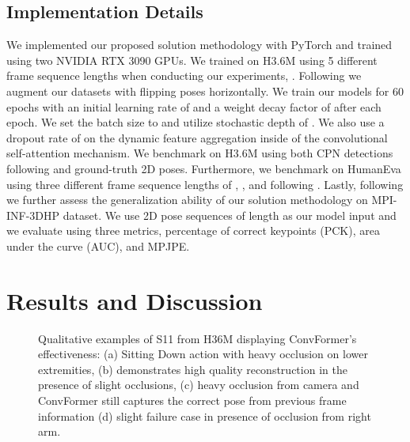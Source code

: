 \documentclass{article}
\begin{document}
\subsection{Implementation Details}
We implemented our proposed solution methodology with PyTorch \cite{PGCCYDLDAL17} and trained using two NVIDIA RTX 3090 GPUs. We trained on H3.6M using 5 different frame sequence lengths when conducting our experiments, . Following \cite{PFGA19} we augment our datasets with flipping poses horizontally. We train our models for 60 epochs with an initial learning rate of   and a weight decay factor of  after each epoch. We set the batch size to  and utilize  stochastic depth \cite{HSLSW16} of . We also use a dropout \cite{JMLR:v15:srivastava14a} rate of  on the dynamic feature aggregation inside of the convolutional self-attention mechanism. We benchmark on H3.6M using both CPN \cite{CWPZY18} detections following \cite{PFGA19,CFSZCL21,WYXL20,ZZMYCD21} and ground-truth 2D poses. Furthermore, we benchmark on HumanEva using three different frame sequence lengths of , , and  following \cite{LSWCCA20}. Lastly, following \cite{ZZMYCD21,li2022mhformer} we further assess the generalization ability of our solution methodology on MPI-INF-3DHP dataset. We use 2D pose sequences of length  as our model input and we evaluate using three metrics, percentage of correct keypoints (PCK), area under the curve (AUC), and MPJPE. 


\section{Results and Discussion}


\begin{figure*}[]
    \centering
    \caption{\small Qualitative examples of S11 from H36M displaying ConvFormer's effectiveness: (a) Sitting Down action with heavy occlusion on lower extremities, (b) demonstrates high quality reconstruction in the presence of slight occlusions, (c) heavy occlusion from camera and ConvFormer still captures the correct pose from previous frame information (d) slight failure case in presence of  occlusion from right arm.}
    \label{fig:H36MExamples}
\end{figure*}
\end{document}
